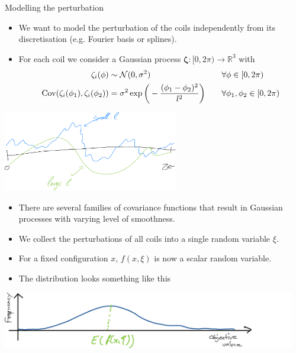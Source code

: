 \documentclass[aspectratio=1610, 10pt]{beamer}
\begin{document}
\begin{frame}{Modelling the perturbation}
    \begin{itemize}
        \item We want to model the perturbation of the coils independently from its discretisation (e.g. Fourier basis or splines).
        \item For each coil we consider a Gaussian process $\bm{\zeta}:[0, 2\pi) \to \mathbb{R}^3$ with
            \begin{equation}
                \begin{aligned}
                    \zeta_i(\phi) &\sim \Nc(0, \sigma^2) &\quad & \forall \phi\in[0,2\pi) \\
                    \mathrm{Cov}(\zeta_i(\phi_1), \zeta_i(\phi_2))&=\sigma^2 \exp\bigg(-\frac{(\phi_1-\phi_2)^2}{l^2} \bigg)&&\forall \phi_1, \phi_2\in[0,2\pi)
                \end{aligned}
            \end{equation}
    \end{itemize} 
    \begin{center}
        \includegraphics[height=3.5cm]{./img/gaussian_process.png}
    \end{center}
    \begin{itemize}
        \item There are several families of covariance functions that result in Gaussian processes with varying level of smoothness.
    \end{itemize}
\end{frame}
\begin{frame}
    \begin{itemize}
        \item We collect the perturbations of all coils into a single random variable $\xi$.   
        \item For a fixed configuration $x$, $f(x, \xi)$ is now a scalar random variable.
        \item The distribution looks something like this
    \end{itemize}
    \begin{center}
        \includegraphics[height=2.5cm]{./img/distribution.png}
    \end{center}
\end{frame}
\end{document}
